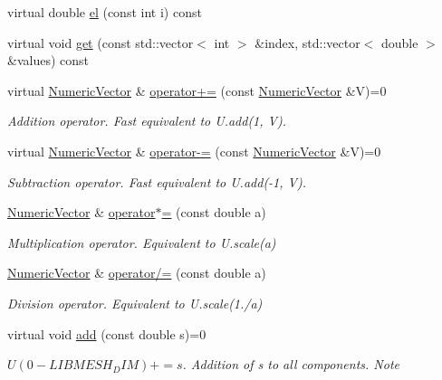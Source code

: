 \begin{DoxyCompactItemize}
virtual double \mbox{\hyperlink{classfemus_1_1_numeric_vector_adc6ca7c50215bf1e82722d08b511ac82}{el}} (const int i) const
\item 
virtual void \mbox{\hyperlink{classfemus_1_1_numeric_vector_a3b3e0e4ad00dfd23aee8d226264cfbb9}{get}} (const std\+::vector$<$ int $>$ \&index, std\+::vector$<$ double $>$ \&values) const
\item 
virtual \mbox{\hyperlink{classfemus_1_1_numeric_vector}{Numeric\+Vector}} \& \mbox{\hyperlink{classfemus_1_1_numeric_vector_a89e26c52946ddd7b18e1e41dda44bec2}{operator+=}} (const \mbox{\hyperlink{classfemus_1_1_numeric_vector}{Numeric\+Vector}} \&V)=0
\begin{DoxyCompactList}\small\item\em Addition operator. Fast equivalent to {\ttfamily U.\+add(1, V)}. \end{DoxyCompactList}\item 
virtual \mbox{\hyperlink{classfemus_1_1_numeric_vector}{Numeric\+Vector}} \& \mbox{\hyperlink{classfemus_1_1_numeric_vector_afa98b4f8f19626765e3d7bc9fb460de6}{operator-\/=}} (const \mbox{\hyperlink{classfemus_1_1_numeric_vector}{Numeric\+Vector}} \&V)=0
\begin{DoxyCompactList}\small\item\em Subtraction operator. Fast equivalent to {\ttfamily U.\+add}(-\/1, V). \end{DoxyCompactList}\item 
\mbox{\hyperlink{classfemus_1_1_numeric_vector}{Numeric\+Vector}} \& \mbox{\hyperlink{classfemus_1_1_numeric_vector_a79269c761ae0135aca7a08e65dd1979c}{operator$\ast$=}} (const double a)
\begin{DoxyCompactList}\small\item\em Multiplication operator. Equivalent to {\ttfamily U.\+scale(a)} \end{DoxyCompactList}\item 
\mbox{\hyperlink{classfemus_1_1_numeric_vector}{Numeric\+Vector}} \& \mbox{\hyperlink{classfemus_1_1_numeric_vector_acd8f1362b2ee17ea29709f681f5d649b}{operator/=}} (const double a)
\begin{DoxyCompactList}\small\item\em Division operator. Equivalent to {\ttfamily U.\+scale}(1./a) \end{DoxyCompactList}\item 
virtual void \mbox{\hyperlink{classfemus_1_1_numeric_vector_a3d6d99a22ab6f27a53e9bda379faab93}{add}} (const double s)=0
\begin{DoxyCompactList}\small\item\em $U(0-LIBMESH_DIM)+=s$. Addition of {\ttfamily s} to all components. Note \end{DoxyCompactList}\item 

\end{DoxyCompactItemize}
